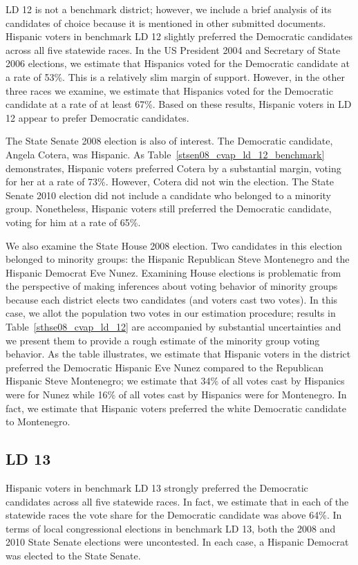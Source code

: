 \documentclass[12pt]{article}
\begin{document}
LD 12 is not a benchmark district; however, we include a brief analysis of its candidates of choice because it is mentioned in other submitted documents. 
Hispanic voters in benchmark LD 12 slightly preferred the Democratic candidates across all five statewide races. In the US President 2004 and Secretary of State 2006 elections, we estimate that Hispanics voted for the Democratic candidate at a rate of 53\%. This is a relatively slim margin of support. However, in the other three races we examine, we estimate that Hispanics voted for the Democratic candidate at a rate of at least 67\%. Based on these results, Hispanic voters in LD 12 appear to prefer Democratic candidates. 

The State Senate 2008 election is also of interest. The Democratic candidate, Angela Cotera, was Hispanic. As Table~\ref{stsen08_cvap_ld_12_benchmark} demonstrates, Hispanic voters preferred Cotera by a substantial margin, voting for her at a rate of 73\%. However, Cotera did not win the election. The State Senate 2010 election did not include a candidate who belonged to a minority group. Nonetheless, Hispanic voters still preferred the Democratic candidate, voting for him at a rate of 65\%.     

We also examine the State House 2008 election. Two candidates in this election belonged to minority groups: the Hispanic Republican Steve Montenegro and the Hispanic Democrat Eve Nunez. Examining House elections is problematic from the perspective of making inferences about voting behavior of minority groups because each district elects two candidates (and voters cast two votes). In this case, we allot the population two votes in our estimation procedure; results in Table~\ref{sthse08_cvap_ld_12} are accompanied by substantial uncertainties and we present them to provide a rough estimate of the minority group voting behavior. As the table illustrates, we estimate that Hispanic voters in the district  preferred the Democratic Hispanic Eve Nunez compared to the Republican Hispanic Steve Montenegro; we estimate that 34\% of all votes cast by Hispanics were for Nunez while 16\% of all votes cast by Hispanics were for Montenegro. In fact, we estimate that Hispanic voters preferred the white Democratic candidate to Montenegro. 
 
\subsection{LD 13}
Hispanic voters in benchmark LD 13 strongly preferred the Democratic candidates across all five statewide races. In fact, we estimate that in each of the statewide races the vote share for the Democratic candidate was above 64\%. In terms of local congressional elections in benchmark LD 13, both the 2008 and 2010 State Senate elections were uncontested. In each case, a Hispanic Democrat was elected to the State Senate.
\end{document}
